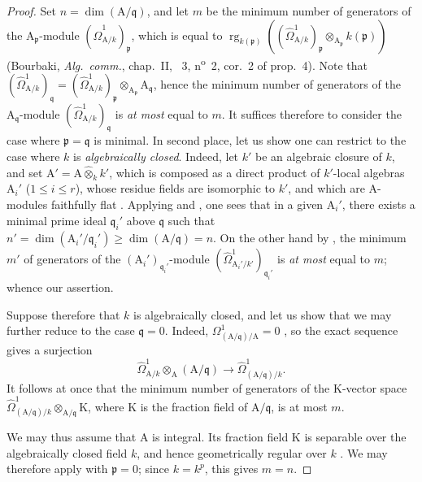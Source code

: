 
\begin{proof}
Set $n=\dim(\mathrm{A}/\mathfrak{q})$, and let $m$ be the minimum number of generators of the $\mathrm{A}_\mathfrak{p}$-module $(\hat{\Omega}^1_{\mathrm{A}/k})_\mathfrak{p}$, which is equal to $\operatorname{rg}_{k(\mathfrak{p})}((\hat{\Omega}^1_{\mathrm{A}/k})_\mathfrak{p}\otimes_{\mathrm{A}_\mathfrak{p}}k(\mathfrak{p}))$ (Bourbaki, \emph{Alg.\ comm.}, chap.~II, \textsection~3, n\textsuperscript{o}~2, cor.~2 of prop.~4).
Note that $(\hat{\Omega}^1_{\mathrm{A}/k})_\mathfrak{q}=(\hat{\Omega}^1_{\mathrm{A}/k})_\mathfrak{p}\otimes_{\mathrm{A}_\mathfrak{p}}\mathrm{A}_\mathfrak{q}$, hence the minimum number of generators of the $\mathrm{A}_\mathfrak{q}$-module $(\hat{\Omega}^1_{\mathrm{A}/k})_\mathfrak{q}$ is \emph{at most} equal to $m$.
It suffices therefore to consider the case where $\mathfrak{p}=\mathfrak{q}$ is minimal.
In second place, let us show one can restrict to the case where $k$ is \emph{algebraically closed}.
Indeed, let $k'$ be an algebraic closure of $k$, and set $\mathrm{A}'=\mathrm{A}\widehat{\otimes}_kk'$, which is composed as a direct product of $k'$-local algebras $\mathrm{A}_i'$ ($1\leq i\leq r$), whose residue fields are isomorphic to $k'$, and which are $\mathrm{A}$-modules faithfully flat .
Applying  and , one sees that in a given $\mathrm{A}_i'$, there exists a minimal prime ideal $\mathfrak{q}_i'$ above $\mathfrak{q}$ such that $n'=\dim(\mathrm{A}_i'/\mathfrak{q}_i')\geq\dim(\mathrm{A}/\mathfrak{q})=n$.
On the other hand by , the minimum $m'$ of generators of the $(\mathrm{A}_i')_{\mathfrak{q}_i'}$-module $(\hat{\Omega}^1_{\mathrm{A}_i'/k'})_{\mathfrak{q}_i'}$ is \emph{at most} equal to $m$; whence our assertion.

Suppose therefore that $k$ is algebraically closed, and let us show that we may further reduce to the case $\mathfrak q=0$. Indeed, $\Omega^1_{(\mathrm{A}/\mathfrak q)/\mathrm{A}}=0$ , so the exact sequence  gives a surjection
\[
  \hat{\Omega}^1_{\mathrm{A}/k}\otimes_{\mathrm{A}}(\mathrm{A}/\mathfrak q)
  \longrightarrow \hat{\Omega}^1_{(\mathrm{A}/\mathfrak q)/k}.
\]
It follows at once that the minimum number of generators of the $\mathrm{K}$-vector space $\hat{\Omega}^1_{(\mathrm{A}/\mathfrak q)/k}\otimes_{\mathrm{A}/\mathfrak q}\mathrm{K}$, where $\mathrm{K}$ is the fraction field of $\mathrm{A}/\mathfrak q$, is at most $m$.

We may thus assume that $\mathrm{A}$ is integral. Its fraction field $\mathrm{K}$ is separable over the algebraically closed field $k$, and hence geometrically regular over $k$ . We may therefore apply  with $\mathfrak p=0$; since $k=k^p$, this gives $m=n$.
\end{proof}

